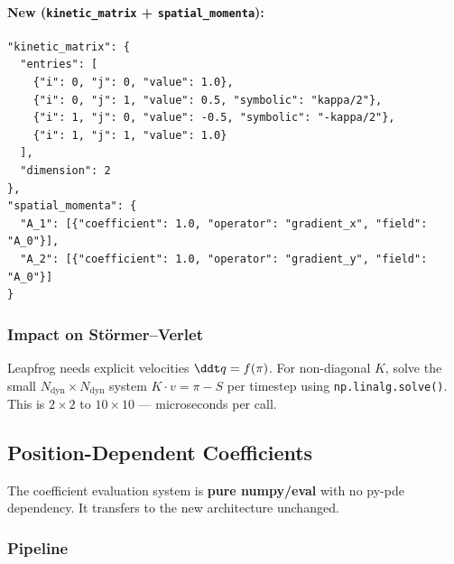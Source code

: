 \paragraph{New (\texttt{kinetic\_matrix} + \texttt{spatial\_momenta}):}
\label{par:new-json}

\begin{lstlisting}[style=json]
"kinetic_matrix": {
  "entries": [
    {"i": 0, "j": 0, "value": 1.0},
    {"i": 0, "j": 1, "value": 0.5, "symbolic": "kappa/2"},
    {"i": 1, "j": 0, "value": -0.5, "symbolic": "-kappa/2"},
    {"i": 1, "j": 1, "value": 1.0}
  ],
  "dimension": 2
},
"spatial_momenta": {
  "A_1": [{"coefficient": 1.0, "operator": "gradient_x", "field": "A_0"}],
  "A_2": [{"coefficient": 1.0, "operator": "gradient_y", "field": "A_0"}]
}
\end{lstlisting}

\subsubsection{Impact on St\"ormer--Verlet}
\label{sec:verlet-impact}

Leapfrog needs explicit velocities $\ddt q = f(\pi)$. For non-diagonal $K$, solve
the small $N_\mathrm{dyn} \times N_\mathrm{dyn}$ system $K \cdot v = \pi - S$ per timestep using
\texttt{np.linalg.solve()}. This is $2\times 2$ to $10\times 10$ --- microseconds per call.

\subsection{Position-Dependent Coefficients}
\label{sec:pos-dep-coefficients}

The coefficient evaluation system is \textbf{pure numpy/eval} with no py-pde
dependency. It transfers to the new architecture unchanged.

\subsubsection{Pipeline}
\label{sec:coeff-pipeline}

